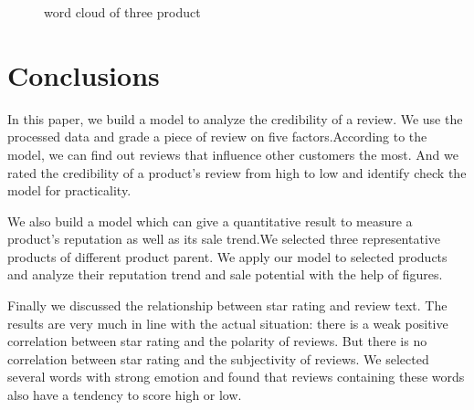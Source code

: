 \documentclass{mcmthesis}
\begin{document}
\begin{figure}[ht]
        \caption{word cloud of three product}
        \label{fig:word_cloud}
\end{figure}


\section{Conclusions}
In this paper, we build a model to analyze the credibility of a review. We use the processed data and grade a piece of review on five factors.According to the model, we can find out reviews that influence other customers the most. And we rated the credibility of a product's review from high to low and identify check the model for practicality.

We also build a model which can give a quantitative result to measure a product's reputation as well as its sale trend.We selected three representative products of different product parent. We apply our model to selected products and analyze their reputation trend and sale potential with the help of figures.

Finally we discussed the relationship between star rating and review text. The results are very much in line with the actual situation: there is a weak positive correlation between star rating and the polarity of reviews. But there is no correlation between star rating and the subjectivity of reviews. We selected several words with strong emotion and found that reviews containing these words also have a tendency to score high or low.
\end{document}
